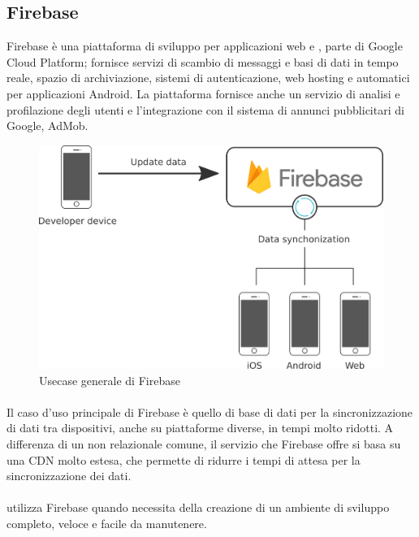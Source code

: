    \subsection{Firebase}
   Firebase è una piattaforma di sviluppo per applicazioni web e , parte di Google Cloud Platform; fornisce servizi di scambio di messaggi e basi di dati in tempo reale, spazio di archiviazione, sistemi di autenticazione, web hosting e  automatici per applicazioni Android. La piattaforma fornisce anche un servizio di analisi e profilazione degli utenti e l'integrazione con il sistema di annunci pubblicitari di Google, AdMob.
   \begin{figure}[H]
      \begin{center}
         \includegraphics[width=14cm,keepaspectratio]{immagini/firebase-usecase}
      \end{center}
      \caption{Usecase generale di Firebase}
   \end{figure}
   \paragraph*{} Il caso d'uso principale di Firebase è quello di base di dati per la sincronizzazione di dati tra dispositivi, anche su piattaforme diverse, in tempi molto ridotti. A differenza di un  non relazionale comune, il servizio che Firebase offre si basa su una \gls{CDN} molto estesa, che permette di ridurre i tempi di attesa per la sincronizzazione dei dati.
   \paragraph*{}
   \nomeAzienda{} utilizza Firebase quando necessita della creazione di un ambiente di sviluppo completo, veloce e facile da manutenere.


